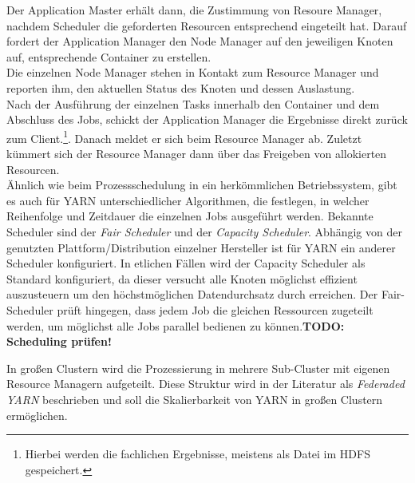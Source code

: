 \noindent
Der Application Master erhält dann, die Zustimmung von Resoure Manager, nachdem Scheduler die geforderten Resourcen entsprechend eingeteilt hat. Darauf fordert der Application Manager den Node Manager auf den jeweiligen Knoten auf, entsprechende Container zu erstellen.\\
Die einzelnen Node Manager stehen in Kontakt zum Resource Manager und reporten ihm, den aktuellen Status des Knoten und dessen Auslastung. \\
Nach der Ausführung der einzelnen Tasks innerhalb den Container und dem Abschluss des Jobs, schickt der Application Manager die Ergebnisse direkt zurück zum Client.\footnote{Hierbei werden die fachlichen Ergebnisse, meistens als Datei im HDFS gespeichert.}. Danach meldet er sich beim Resource Manager ab. Zuletzt kümmert sich der Resource Manager dann über das Freigeben von allokierten Resourcen.\\

\noindent
Ähnlich wie beim Prozessschedulung in ein herkömmlichen Betriebssystem, gibt es auch für YARN unterschiedlicher Algorithmen, die festlegen, in welcher Reihenfolge und Zeitdauer die einzelnen Jobs ausgeführt werden. Bekannte Scheduler sind der \textit{Fair Scheduler} und der \textit{Capacity Scheduler}. Abhängig von der genutzten Plattform/Distribution einzelner Hersteller ist für YARN ein anderer Scheduler konfiguriert. In etlichen Fällen wird der Capacity Scheduler als Standard konfiguriert, da dieser versucht alle Knoten möglichst effizient auszusteuern um den höchstmöglichen Datendurchsatz durch erreichen. Der Fair-Scheduler prüft hingegen, dass jedem Job die gleichen Ressourcen zugeteilt werden, um möglichst alle Jobs parallel bedienen zu können.\textbf{TODO: Scheduling prüfen!}

\noindent
In großen Clustern wird die Prozessierung in mehrere Sub-Cluster mit eigenen Resource Managern aufgeteilt. Diese Struktur wird in der Literatur als \textit{Federaded YARN} beschrieben und soll die Skalierbarkeit von YARN in großen Clustern ermöglichen.

